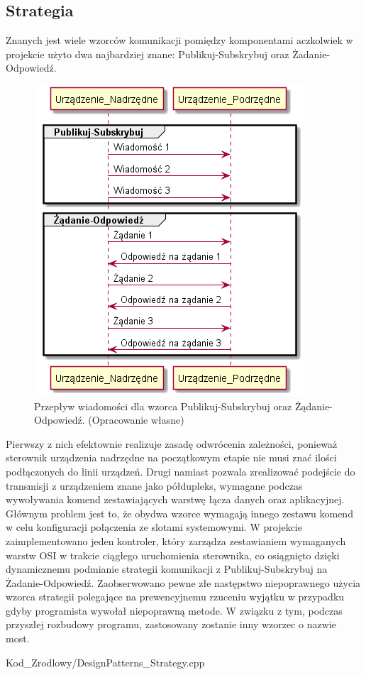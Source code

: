     \subsection{Strategia}
        Znanych jest wiele wzorców komunikacji pomiędzy komponentami aczkolwiek w projekcie użyto dwa najbardziej znane: Publikuj-Subskrybuj oraz Żadanie-Odpowiedź.
        
        \begin{figure}[h!]
            \centering
            \includegraphics[scale=0.75]{out/Diagramy/PublishSubscribe_RequestResponse.png}
            \caption{Przepływ wiadomości dla wzorca Publikuj-Subskrybuj oraz Żądanie-Odpowiedź.
                \newline(Opracowanie własne)}
        \end{figure}

        Pierwszy z nich efektownie realizuje zasadę odwrócenia zależności, ponieważ sterownik urządzenia nadrzędne na początkowym etapie nie musi znać
        ilości podłączonych do linii urządzeń. Drugi namiast pozwala zrealizować podejście do transmisji z urządzeniem znane jako półdupleks, wymagane podczas
        wywoływania komend zestawiających warstwę łącza danych oraz aplikacyjnej. Głównym problem jest to, że obydwa wzorce wymagają innego zestawu komend w celu
        konfiguracji połączenia ze slotami systemowymi. W projekcie zaimplementowano jeden kontroler, który zarządza zestawianiem wymaganych warstw OSI w trakcie
        ciągłego uruchomienia sterownika, co osiągnięto dzięki dynamicznemu podmianie strategii komunikacji z Publikuj-Subskrybuj na Żadanie-Odpowiedź.
        Zaobserwowano pewne złe następstwo niepoprawnego użycia wzorca strategii polegające na prewencyjnemu rzuceniu wyjątku w przypadku gdyby programista wywołał niepoprawną metode.
        W związku z tym, podczas przyszłej rozbudowy programu, zastosowany zostanie inny wzorzec o nazwie most.
        \newpage
        
        {Kod_Zrodlowy/DesignPatterns_Strategy.cpp}
    \newpage
